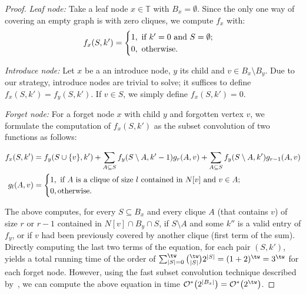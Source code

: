 \begin{proof}
    \textit{Leaf node:} Take a leaf node $x \in \mathbb{T}$ with $B_x = \emptyset$. 
    Since the only one way of covering an empty graph is with zero cliques, we compute $f_x$ with:
    \begin{equation*}
        \centering
        \hfill f_x(S, k') =
        \begin{cases}
            1, \text{ if } k' = 0 \text{ and } S = \emptyset \text{;}\\
            0, \text{ otherwise.}\\
        \end{cases}
    \end{equation*}
    
    \emph{Introduce node:} Let $x$ be a an introduce node, $y$ its child and $v \in B_x \setminus B_y$.
    Due to our strategy, introduce nodes are trivial to solve; it suffices to define $f_x(S, k') = f_y(S, k')$. If $v \in S$, we simply define $f_x(S, k') = 0$.
    
    \emph{Forget node:} For a forget node $x$ with child $y$ and forgotten vertex $v$, we formulate the computation of $f_x(S, k')$ as the subset convolution of two functions as follows:
    
    \begin{align*}
        \centering
        f_x(S, k') &= f_y(S \cup \{v\}, k') + \sum_{A \subseteq S} f_y(S \setminus A, k' - 1)g_r(A, v) + \sum_{A \subseteq S} f_y(S \setminus A, k')g_{r-1}(A, v)\\
        g_l(A, v) &=
            \begin{cases}
                1, \text{ if $A$ is a clique of size $l$ contained in $N[v]$ and $v \in A$;}\\
                0, \text{otherwise.}
            \end{cases}
    \end{align*}
    
    The above computes, for every $S \subseteq B_x$ and every clique $A$ (that contains $v$) of size $r$ or $r - 1$ contained in $N[v] \cap B_y \cap S$, if $S \setminus A$ and some $k''$ is a valid entry of $f_y$, or if $v$ had been previously covered by another clique (first term of the sum).
    Directly computing the last two terms of the equation, for each pair $(S, k')$, yields a total running time of the order of $ \sum_{|S| = 0}^\tw \binom{\tw}{|S|}2^{|S|} = (1+2)^\tw = 3^\tw$ for each forget node.
    However, using the fast subset convolution technique described by~\cite{fourier_mobius}, we can compute the above equation in time $\bigOs{2^{|B_x|}} = \bigOs{2^{\tw}}$.
    

\end{proof}
